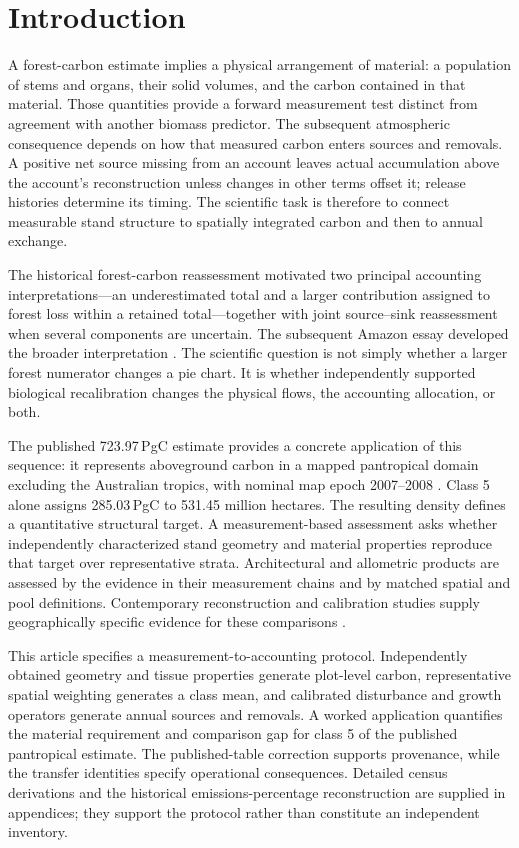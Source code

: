 \documentclass[11pt,a4paper]{article}
\theoremstyle{remark}
\begin{document}
\section{Introduction}
A forest-carbon estimate implies a physical arrangement of material: a population of stems and organs, their solid volumes, and the carbon contained in that material. Those quantities provide a forward measurement test distinct from agreement with another biomass predictor. The subsequent atmospheric consequence depends on how that measured carbon enters sources and removals. A positive net source missing from an account leaves actual accumulation above the account's reconstruction unless changes in other terms offset it; release histories determine its timing. The scientific task is therefore to connect measurable stand structure to spatially integrated carbon and then to annual exchange.

The historical forest-carbon reassessment \citep{Arellano2016} motivated two principal accounting interpretations---an underestimated total and a larger contribution assigned to forest loss within a retained total---together with joint source--sink reassessment when several components are uncertain. The subsequent Amazon essay developed the broader interpretation \citep{Arellano2021}. The scientific question is not simply whether a larger forest numerator changes a pie chart. It is whether independently supported biological recalibration changes the physical flows, the accounting allocation, or both.

The published 723.97\,PgC estimate provides a concrete application of this sequence: it represents aboveground carbon in a mapped pantropical domain excluding the Australian tropics, with nominal map epoch 2007--2008 \citep[pp.~23--24]{Arellano2016}. Class 5 alone assigns 285.03\,PgC to 531.45 million hectares. The resulting density defines a quantitative structural target. A measurement-based assessment asks whether independently characterized stand geometry and material properties reproduce that target over representative strata. Architectural and allometric products are assessed by the evidence in their measurement chains and by matched spatial and pool definitions. Contemporary reconstruction and calibration studies supply geographically specific evidence for these comparisons \citep{Gonzalez2018,Momo2018,Demol2024,Huertas2025}.

This article specifies a measurement-to-accounting protocol. Independently obtained geometry and tissue properties generate plot-level carbon, representative spatial weighting generates a class mean, and calibrated disturbance and growth operators generate annual sources and removals. A worked application quantifies the material requirement and comparison gap for class 5 of the published pantropical estimate. The published-table correction supports provenance, while the transfer identities specify operational consequences. Detailed census derivations and the historical emissions-percentage reconstruction are supplied in appendices; they support the protocol rather than constitute an independent inventory.
\end{document}
